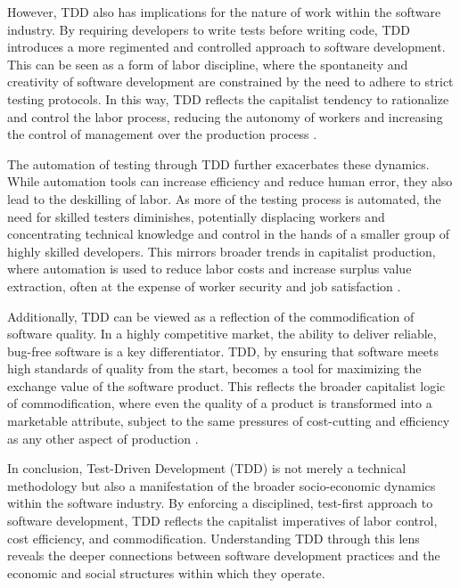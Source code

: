 \begin{refsection}
However, TDD also has implications for the nature of work within the software industry. By requiring developers to write tests before writing code, TDD introduces a more regimented and controlled approach to software development. This can be seen as a form of labor discipline, where the spontaneity and creativity of software development are constrained by the need to adhere to strict testing protocols. In this way, TDD reflects the capitalist tendency to rationalize and control the labor process, reducing the autonomy of workers and increasing the control of management over the production process \cite[pp.~58-63]{marx2008capital}.

The automation of testing through TDD further exacerbates these dynamics. While automation tools can increase efficiency and reduce human error, they also lead to the deskilling of labor. As more of the testing process is automated, the need for skilled testers diminishes, potentially displacing workers and concentrating technical knowledge and control in the hands of a smaller group of highly skilled developers. This mirrors broader trends in capitalist production, where automation is used to reduce labor costs and increase surplus value extraction, often at the expense of worker security and job satisfaction \cite[pp.~492-497]{marx2008capital}.

Additionally, TDD can be viewed as a reflection of the commodification of software quality. In a highly competitive market, the ability to deliver reliable, bug-free software is a key differentiator. TDD, by ensuring that software meets high standards of quality from the start, becomes a tool for maximizing the exchange value of the software product. This reflects the broader capitalist logic of commodification, where even the quality of a product is transformed into a marketable attribute, subject to the same pressures of cost-cutting and efficiency as any other aspect of production \cite[pp.~115-120]{kaner1999testing}.

In conclusion, Test-Driven Development (TDD) is not merely a technical methodology but also a manifestation of the broader socio-economic dynamics within the software industry. By enforcing a disciplined, test-first approach to software development, TDD reflects the capitalist imperatives of labor control, cost efficiency, and commodification. Understanding TDD through this lens reveals the deeper connections between software development practices and the economic and social structures within which they operate.


\end{refsection}
